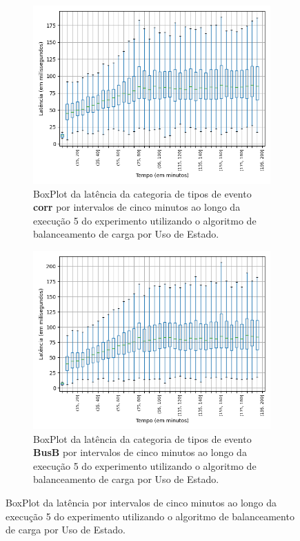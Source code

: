\begin{figure}
\begin{subfigure}{.5\textwidth}
\centering
\includegraphics[width=\textwidth]{figuras/graphics/boxplot_10-dez-su_corr.png}
\caption{BoxPlot da latência da categoria de tipos de evento \textbf{corr} por intervalos de cinco minutos ao longo da execução 5 do experimento utilizando o algoritmo de balanceamento de carga por Uso de Estado.}
\label{fig:BoxPlot_corr_SU_10-dez-su}
\end{subfigure}%
\begin{subfigure}{.5\textwidth}
\centering
\includegraphics[width=\textwidth]{figuras/graphics/boxplot_10-dez-su_busb.png}
\caption{BoxPlot da latência da categoria de tipos de evento \textbf{BusB} por intervalos de cinco minutos ao longo da execução 5 do experimento utilizando o algoritmo de balanceamento de carga por Uso de Estado.}
\label{fig:BoxPlot_BusB_SU_10-dez-su}
\end{subfigure}%
\caption{BoxPlot da latência por intervalos de cinco minutos ao longo da execução 5 do experimento utilizando o algoritmo de balanceamento de carga por Uso de Estado.}
\end{figure}




